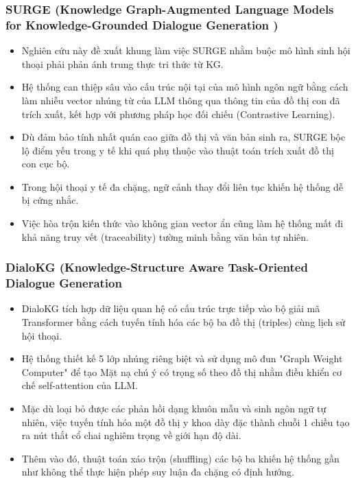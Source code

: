 \documentclass[conference]{IEEEtran}
\begin{document}
\subsubsection{SURGE (Knowledge Graph-Augmented Language Models for Knowledge-Grounded Dialogue Generation \cite{kang2023knowledge})}
\begin{itemize}
    \item Nghiên cứu này đề xuất khung làm việc SURGE nhằm buộc mô hình sinh hội thoại phải phản ánh trung thực tri thức từ KG.
    \item Hệ thống can thiệp sâu vào cấu trúc nội tại của mô hình ngôn ngữ bằng cách làm nhiễu vector nhúng từ của LLM thông qua thông tin của đồ thị con đã trích xuất, kết hợp với phương pháp học đối chiếu (Contrastive Learning).
    \item Dù đảm bảo tính nhất quán cao giữa đồ thị và văn bản sinh ra, SURGE bộc lộ điểm yếu trong y tế khi quá phụ thuộc vào thuật toán trích xuất đồ thị con cục bộ.
    \item Trong hội thoại y tế đa chặng, ngữ cảnh thay đổi liên tục khiến hệ thống dễ bị cứng nhắc.
    \item Việc hòa trộn kiến thức vào không gian vector ẩn cũng làm hệ thống mất đi khả năng truy vết (traceability) tường minh bằng văn bản tự nhiên.
\end{itemize}


\subsubsection{DialoKG (Knowledge-Structure Aware Task-Oriented Dialogue Generation \cite{rony2022dialokg}}
\begin{itemize}
    \item DialoKG tích hợp dữ liệu quan hệ có cấu trúc trực tiếp vào bộ giải mã Transformer bằng cách tuyến tính hóa các bộ ba đồ thị (triples) cùng lịch sử hội thoại.
    \item Hệ thống thiết kế 5 lớp nhúng riêng biệt và sử dụng mô đun "Graph Weight Computer" để tạo Mặt nạ chú ý có trọng số theo đồ thị nhằm điều khiển cơ chế self-attention của LLM.
    \item Mặc dù loại bỏ được các phản hồi dạng khuôn mẫu và sinh ngôn ngữ tự nhiên, việc tuyến tính hóa một đồ thị y khoa dày đặc thành chuỗi 1 chiều tạo ra nút thắt cổ chai nghiêm trọng về giới hạn độ dài.
    \item Thêm vào đó, thuật toán xáo trộn (shuffling) các bộ ba khiến hệ thống gần như không thể thực hiện phép suy luận đa chặng có định hướng.
\end{itemize}
\end{document}
